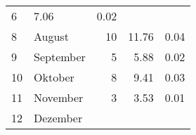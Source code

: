 \begin{longtable}{lXrrr}
       \num{6} &
       \num[round-mode=places,round-precision=2]{7.06} &
         \num[round-mode=places,round-precision=2]{0.02} \\

     8 &
     \multicolumn{1}{X}{ August   } &


       \num{10} &
       \num[round-mode=places,round-precision=2]{11.76} &
         \num[round-mode=places,round-precision=2]{0.04} \\

     9 &
     \multicolumn{1}{X}{ September   } &


       \num{5} &
       \num[round-mode=places,round-precision=2]{5.88} &
         \num[round-mode=places,round-precision=2]{0.02} \\

     10 &
     \multicolumn{1}{X}{ Oktober   } &


       \num{8} &
       \num[round-mode=places,round-precision=2]{9.41} &
         \num[round-mode=places,round-precision=2]{0.03} \\

     11 &
     \multicolumn{1}{X}{ November   } &


       \num{3} &
       \num[round-mode=places,round-precision=2]{3.53} &
         \num[round-mode=places,round-precision=2]{0.01} \\

     12 &
     \multicolumn{1}{X}{ Dezember   } &



\end{longtable}

